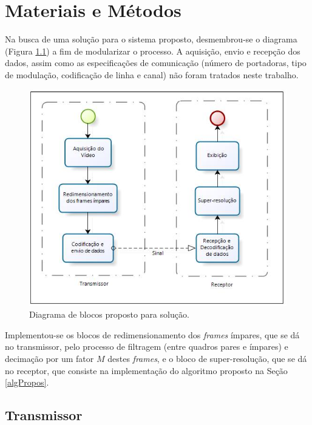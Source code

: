 \chapter[Materiais e Métodos]{Materiais e Métodos}

Na busca de uma solução para o sistema proposto, desmembrou-se o diagrama (Figura \ref{fig:blocos}) a fim de modularizar o processo. A aquisição, envio e recepção dos dados, assim como as especificações de comunicação (número de portadoras, tipo de modulação, codificação de linha e canal) não foram tratados neste trabalho. 


\begin{figure}[h]
	\centering
	\includegraphics[scale=.7]{figuras/diagrama_blocos_solucao.jpg}
	\caption{Diagrama de blocos proposto para solução.}
	\label{fig:blocos}
\end{figure}

Implementou-se os blocos de redimensionamento dos \textit{frames} ímpares, que se dá no transmissor, pelo processo de filtragem (entre quadros pares e ímpares) e  decimação por um fator $M$ destes \textit{frames}, e o bloco de super-resolução, que se dá no receptor, que consiste na implementação do algoritmo proposto na Seção \ref{algPropos}. 

\section{Transmissor}

